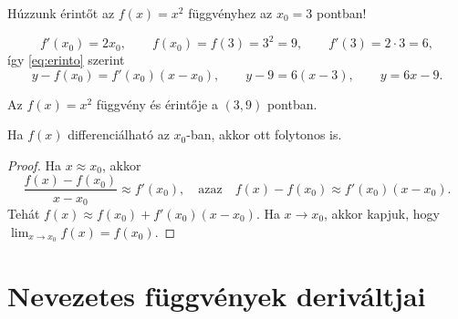 \documentclass[11pt]{article}
\begin{document}
\begin{exbox}
\begin{example}
Húzzunk érintőt az $f(x)=x^{2}$ függvényhez az $x_{0}=3$ pontban!
\end{example}
\end{exbox}
\begin{solution}
\[
f'(x_{0})=2x_{0},\qquad f(x_{0})=f(3)=3^{2}=9,\qquad f'(3)=2\cdot 3=6,
\]
így \eqref{eq:erinto} szerint
\[
y-f(x_{0})=f'(x_{0})(x-x_{0}),\qquad y-9=6(x-3),\qquad y=6x-9 .
\]

\begin{notefig}{Az $f(x)=x^{2}$ függvény és érintője a $(3, 9)$ pontban.}
\end{notefig}
\end{solution}

\begin{thmbox}
\begin{theorem}
Ha $f(x)$ differenciálható az $x_{0}$-ban, akkor ott folytonos is.
\end{theorem}
\end{thmbox}
\begin{proof}
Ha $x\approx x_{0}$, akkor
\[
\frac{f(x)-f(x_{0})}{x-x_{0}}\approx f'(x_{0}),\quad\text{azaz}\quad f(x)-f(x_{0})\approx f'(x_{0})(x-x_{0}).
\]
Tehát $f(x)\approx f(x_{0})+f'(x_{0})(x-x_{0})$. Ha $x\to x_{0}$, akkor kapjuk, hogy $\displaystyle\lim_{x\to x_{0}}f(x)=f(x_{0})$.
\end{proof}

\section{Nevezetes függvények deriváltjai}
\end{document}

